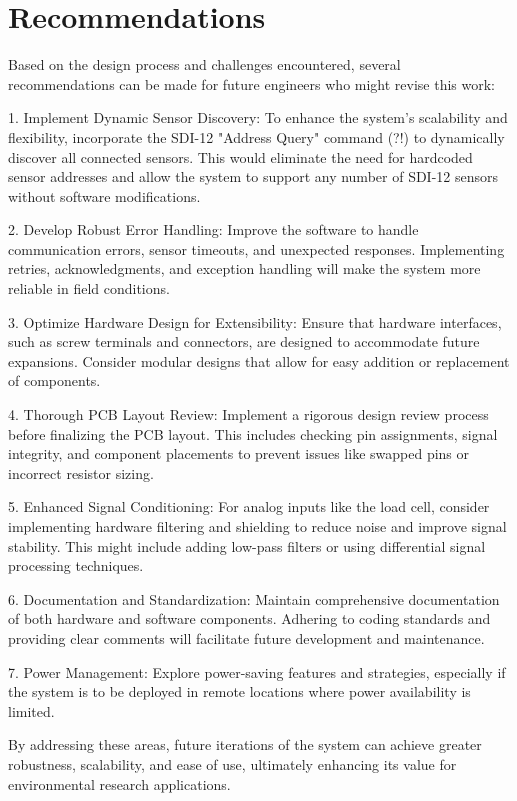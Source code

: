 \section{Recommendations}

Based on the design process and challenges encountered, several recommendations can be made for future engineers who might revise this work:

1. Implement Dynamic Sensor Discovery: To enhance the system's scalability and flexibility, incorporate the SDI-12 "Address Query" command (?!) to dynamically discover all connected sensors. This would eliminate the need for hardcoded sensor addresses and allow the system to support any number of SDI-12 sensors without software modifications.

2. Develop Robust Error Handling: Improve the software to handle communication errors, sensor timeouts, and unexpected responses. Implementing retries, acknowledgments, and exception handling will make the system more reliable in field conditions.

3. Optimize Hardware Design for Extensibility: Ensure that hardware interfaces, such as screw terminals and connectors, are designed to accommodate future expansions. Consider modular designs that allow for easy addition or replacement of components.

4. Thorough PCB Layout Review: Implement a rigorous design review process before finalizing the PCB layout. This includes checking pin assignments, signal integrity, and component placements to prevent issues like swapped pins or incorrect resistor sizing.

5. Enhanced Signal Conditioning: For analog inputs like the load cell, consider implementing hardware filtering and shielding to reduce noise and improve signal stability. This might include adding low-pass filters or using differential signal processing techniques.

6. Documentation and Standardization: Maintain comprehensive documentation of both hardware and software components. Adhering to coding standards and providing clear comments will facilitate future development and maintenance.

7. Power Management: Explore power-saving features and strategies, especially if the system is to be deployed in remote locations where power availability is limited.

By addressing these areas, future iterations of the system can achieve greater robustness, scalability, and ease of use, ultimately enhancing its value for environmental research applications.